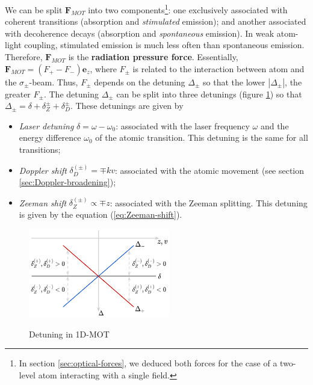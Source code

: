 We can be split $ \mathbf{F}_{MOT} $ into two components\footnote{In section \ref{sec:optical-forces}, we deduced both forces for the case of a two-level atom interacting with a single field.}: one exclusively associated with coherent transitions (absorption and \textit{stimulated} emission); and another associated with decoherence decays (absorption and \textit{spontaneous} emission). In weak atom-light coupling, stimulated emission is much less often than spontaneous emission. Therefore, $ \mathbf{F}_{MOT} $ is the \textbf{radiation pressure force}. Essentially, $ \mathbf{F}_{MOT} = (F_{+} - F_{-}) \mathbf{e}_z $, where $ F_{\pm} $ is related to the interaction between atom and the $ \sigma_{\pm} $-beam. Thus, $ F_{\pm} $ depends on the detuning $ \Delta_{\pm} $ so that the lower $ |\Delta_{\pm}| $, the greater $ F_{\pm} $. The detuning $ \Delta_{\pm} $ can be split into three detunings (figure \ref{fig:detuning-1D-MOT}) so that $ \Delta_{\pm} = \delta + \delta_Z^{\pm} + \delta_D^{\pm} $. These detunings are given by
\begin{itemize}
	\item \textit{Laser detuning} $ \delta = \omega - \omega_0 $: associated with the laser frequency $ \omega $ and the energy difference $ \omega_0 $ of the atomic transition. This detuning is the same for all transitions;

	\item \textit{Doppler shift} $ \delta_{D}^{(\pm)} = \mp k v $: associated with the atomic movement (see section \ref{sec:Doppler-broadening});

	\item \textit{Zeeman shift} $ \delta_Z^{(\pm)} \propto \mp z $: associated with the Zeeman splitting. This detuning is given by the equation (\ref{eq:Zeeman-shift}).
\end{itemize}

\begin{figure}[!ht]
	\centering
	\caption{Detuning in 1D-MOT}
	\includegraphics[width=0.55\textwidth]{USPSC-img/1D-MOT-detunings.png}
	\vspace{5pt}
	\label{fig:detuning-1D-MOT}
	\vspace{-20pt}
\end{figure}

